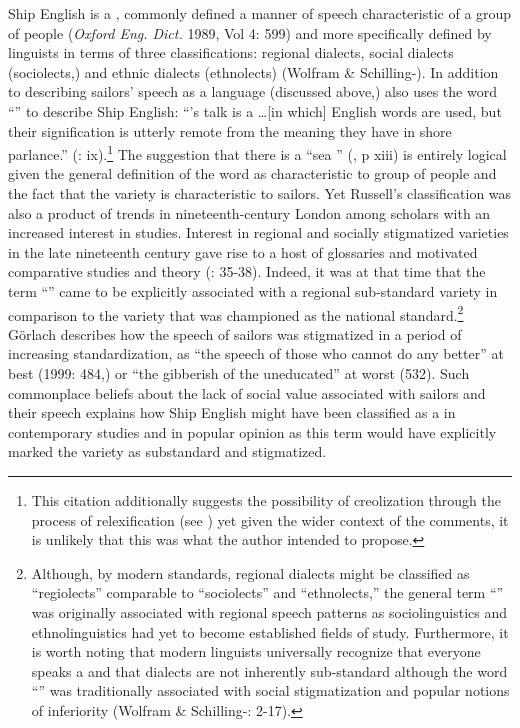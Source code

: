 Ship English is a , commonly defined a manner of speech characteristic of a group of people (\textit{Oxford Eng. Dict.} 1989, Vol 4: 599) and more specifically defined by linguists in terms of three classifications: regional dialects, social dialects (sociolects,) and ethnic dialects (ethnolects) (Wolfram \& Schilling-\citealt{Estes2016}). In addition to describing sailors’ speech as a language (discussed above,) \citet{Russell1883} also uses the word “” to describe Ship English: “’s talk is a …[in which] English words are used, but their signification is utterly remote from the meaning they have in shore parlance.” (\citealt{Russell1883}: ix).\footnote{This citation additionally suggests the possibility of creolization through the process of relexification (see \citealt{Thompson1961}) yet given the wider context of the comments, it is unlikely that this was what the author intended to propose.}  The suggestion that there is a “sea ” (\citealt{Russell1883}, p xiii) is entirely logical given the general definition of the word as characteristic to group of people and the fact that the variety is characteristic to sailors. Yet Russell’s classification was also a product of trends in nineteenth-century London among scholars with an increased interest in  studies. Interest in regional and socially stigmatized varieties in the late nineteenth century gave rise to a host of  glossaries {and motivated comparative studies and  theory (\citealt{Petyt1980}: 35-38). Indeed, it was at that time that the term “” came to be explicitly associated with a regional sub-standard variety in comparison to the variety that was championed as the national standard.}\footnote{{Although}, by modern standards, regional dialects might be classified as “regiolects” {comparable to “sociolects” and “ethnolects,” the general term “” was originally} associated with regional speech patterns as sociolinguistics and ethnolinguistics had yet to become established fields of study. Furthermore,{ it is worth noting that modern} linguists universally recognize that everyone speaks a  and that dialects are not inherently sub-standard although the word “” was traditionally associated with social stigmatization and popular notions of inferiority (Wolfram \& Schilling-\citealt{Estes2016}: 2-17).} {} Görlach describes how{ the} speech of sailors was stigmatized in a period of increasing standardization, as “the speech of those who cannot do any better” at best (1999: 484,) or “the gibberish of the uneducated” at worst (532).{ Such commonplace beliefs about the lack of social value associated with sailors and their speech explains how Ship English might have been classified as a  in contemporary studies and in popular opinion as this term would have explicitly marked the variety as substandard and stigmatized.}

